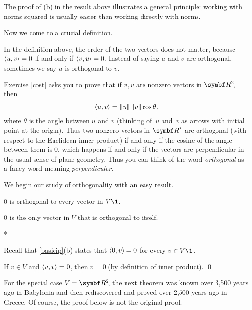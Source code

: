 The proof of (b) in the result above illustrates a general principle: working with norms squared is usually easier than working directly with norms.

\pagebreak[3]

Now we come to a crucial definition.



In the definition above, the order of the two vectors does not matter, because $\langle u, v\rangle = 0$ if and only if $\langle v, u\rangle = 0$. Instead of saying $u$ and $v$ are orthogonal, sometimes we say $u$ is  orthogonal to $v$.

Exercise \ref{cost} asks you to prove that if $u, v$ are nonzero vectors in $\RR{2}$, then
\[
\langle u,v\rangle = \|u\| \, \|v\| \cos \theta,
\]
where $\theta$ is the angle between $u$ and $v$ (thinking of~$u$ and~$v$ as arrows
with initial point at the origin). Thus two nonzero vectors in $\R2$ are orthogonal (with respect to the Euclidean inner product) if and only if the cosine of the angle between them is $0$, which happens if and only if the vectors are perpendicular in the usual sense of plane geometry. Thus you can think of the word \textit{orthogonal} as a fancy word meaning \textit{perpendicular}.

We begin our study of orthogonality with an easy result.

{\begin{subtheorem}
\item
$0$ is orthogonal to every vector in $V\1$.
\item
$0$ is the only vector in $V$ that is orthogonal to itself.
\end{subtheorem}}

\proof
\begin{subtheorem}*
\item
Recall that \ref{basicip}(b) states that $\langle0, v\rangle = 0$ for every $v \in V\1$.
\item
If $v \in V$ and $\langle v,v\rangle = 0$, then $v = 0$ (by definition of inner product).
\qed
\end{subtheorem}

For the special case $V = \RR{2}$, the next theorem was known over 3,500 years ago in Babylonia and then rediscovered and proved over 2,500 years ago in Greece. Of course, the proof below is not the original proof.

